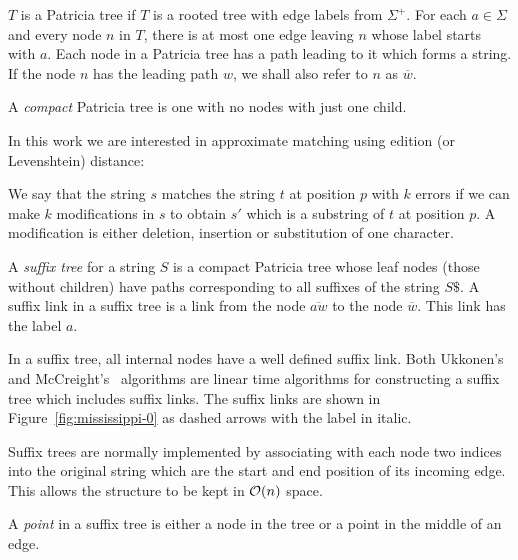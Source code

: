 \begin{definition}
$T$ is a Patricia tree if $T$ is a rooted tree with edge labels from $\Sigma^+$. For each $a \in \Sigma$ and every node $n$ in $T$, there is at most one edge leaving $n$ whose label starts with $a$. Each node in a Patricia tree has a path leading to it which forms a string. If the node $n$ has the leading path $w$, we shall also refer to $n$ as $\overline{w}$.

A \emph{compact} Patricia tree is one with no nodes with just one child.
\end{definition}

%
In this work we are interested in approximate matching using edition (or Levenshtein) distance:

\begin{definition}
We say that the string $s$ matches the string $t$ at position $p$ with $k$ errors if we can make $k$ modifications in $s$ to obtain $s'$ which is a substring of $t$ at position $p$. A modification is either deletion, insertion or substitution of one character.
\end{definition}

\begin{definition}
A \emph{suffix tree} for a string $S$ is a compact Patricia tree whose leaf nodes (those without children) have paths corresponding to all suffixes of the string $S\$ $. A suffix link in a suffix tree is a link from the node $\overline{aw}$ to the node $\overline{w}$. This link has the label $a$.
\end{definition}

In a suffix tree, all internal nodes have a well defined suffix link. Both Ukkonen's~\cite{ukkonen92constructing} and McCreight's~\cite{mccreight} algorithms are linear time algorithms for constructing a suffix tree which includes suffix links. The suffix links are shown in Figure~\ref{fig:mississippi-0} as dashed arrows with the label in italic.

Suffix trees are normally implemented by associating with each node two indices into the original string which are the start and end position of its incoming edge. This allows the structure to be kept in $\mathcal{O}(n)$ space.

\begin{definition}
A \emph{point} in a suffix tree is either a node in the tree or a point in the middle of an edge.
\end{definition}


